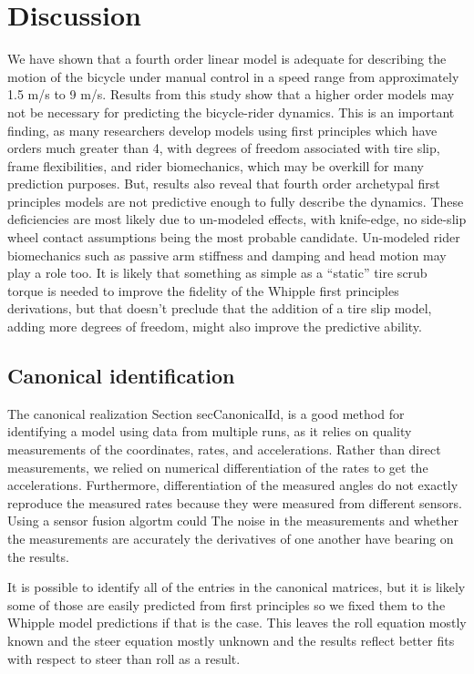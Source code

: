 \documentclass[a4paper]{article}
\begin{document}
\section{Discussion}

We have shown that a fourth order linear model is adequate for describing the
motion of the bicycle under manual control in a speed range from approximately
1.5 m/s to 9 m/s. Results from this study show that a higher order models may not be necessary for
predicting the bicycle-rider dynamics. This is an important finding, as many
researchers develop models using first principles which have orders much greater
than 4, with degrees of freedom associated with tire slip, frame flexibilities,
and rider biomechanics, which may be overkill for many prediction purposes. But, results 
also reveal that fourth order archetypal first principles models are not
predictive enough to fully describe the dynamics. These deficiencies are most 
likely due to un-modeled effects, with knife-edge, no side-slip wheel contact 
assumptions being the most probable candidate. Un-modeled rider biomechanics such as passive arm stiffness and
damping and head motion may play a role too. It is likely that something as
simple as a ``static'' tire scrub torque is needed to improve the fidelity of
the Whipple first principles derivations, but that doesn't preclude that the
addition of a tire slip model, adding more degrees of freedom, might also
improve the predictive ability.

\subsection{Canonical identification}

The canonical realization Section secCanonicalId, %
is a good method for identifying a model using data from multiple runs, as it relies 
on quality measurements of the coordinates, rates, and accelerations. Rather than 
direct measurements, we relied on numerical differentiation of the rates to get the accelerations. 
Furthermore, differentiation of the measured angles do not exactly reproduce the 
measured rates because they were measured from different
sensors. Using a sensor fusion algortm could The noise in the measurements and
whether the measurements are accurately the derivatives of one another have
bearing on the results.%

It is possible to identify all of the entries in the canonical matrices, but it
is likely some of those are easily predicted from first principles so we fixed
them to the Whipple model predictions if that is the case. %
This leaves the roll equation mostly known and the steer equation mostly unknown and the results
reflect better fits with respect to steer than roll as a result. %
\end{document}
